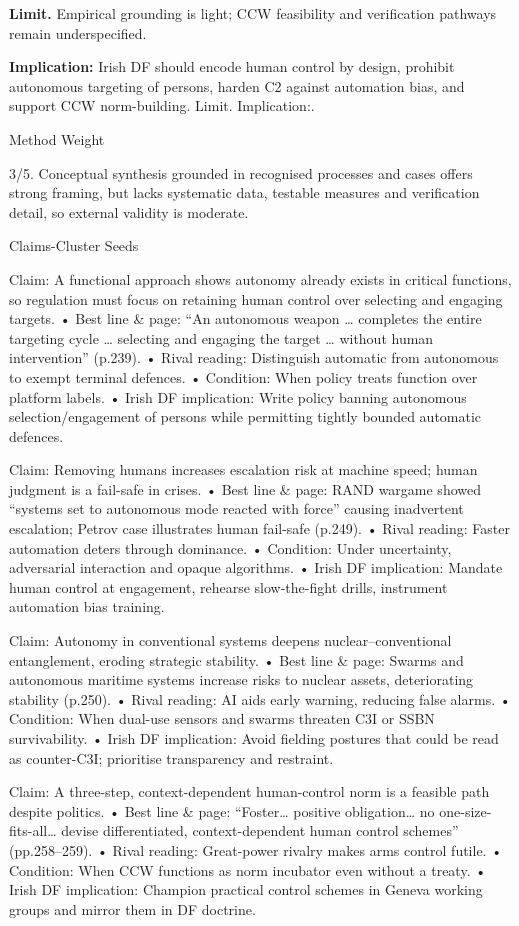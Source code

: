 \textbf{Limit.} Empirical grounding is light; CCW feasibility and verification pathways remain underspecified.

\textbf{Implication:} Irish DF should encode human control by design, prohibit autonomous targeting of persons, harden C2 against automation bias, and support CCW norm-building. Limit. Implication:.

Method Weight

3/5. Conceptual synthesis grounded in recognised processes and cases offers strong framing, but lacks systematic data, testable measures and verification detail, so external validity is moderate.

Claims-Cluster Seeds

Claim: A functional approach shows autonomy already exists in critical functions, so regulation must focus on retaining human control over selecting and engaging targets.
• Best line & page: “An autonomous weapon … completes the entire targeting cycle … selecting and engaging the target … without human intervention” (p.239).
• Rival reading: Distinguish automatic from autonomous to exempt terminal defences.
• Condition: When policy treats function over platform labels.
• Irish DF implication: Write policy banning autonomous selection/engagement of persons while permitting tightly bounded automatic defences.

Claim: Removing humans increases escalation risk at machine speed; human judgment is a fail-safe in crises.
• Best line & page: RAND wargame showed “systems set to autonomous mode reacted with force” causing inadvertent escalation; Petrov case illustrates human fail-safe (p.249).
• Rival reading: Faster automation deters through dominance.
• Condition: Under uncertainty, adversarial interaction and opaque algorithms.
• Irish DF implication: Mandate human control at engagement, rehearse slow-the-fight drills, instrument automation bias training.

Claim: Autonomy in conventional systems deepens nuclear–conventional entanglement, eroding strategic stability.
• Best line & page: Swarms and autonomous maritime systems increase risks to nuclear assets, deteriorating stability (p.250).
• Rival reading: AI aids early warning, reducing false alarms.
• Condition: When dual-use sensors and swarms threaten C3I or SSBN survivability.
• Irish DF implication: Avoid fielding postures that could be read as counter-C3I; prioritise transparency and restraint.

Claim: A three-step, context-dependent human-control norm is a feasible path despite politics.
• Best line & page: “Foster… positive obligation… no one-size-fits-all… devise differentiated, context-dependent human control schemes” (pp.258–259).
• Rival reading: Great-power rivalry makes arms control futile.
• Condition: When CCW functions as norm incubator even without a treaty.
• Irish DF implication: Champion practical control schemes in Geneva working groups and mirror them in DF doctrine.

